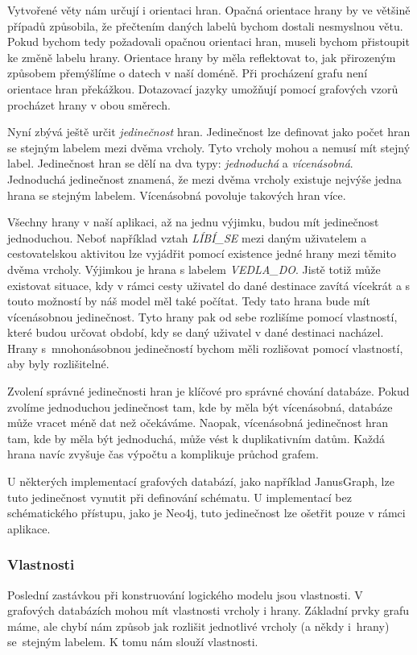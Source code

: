 \documentclass[
  program=infoi,
  biblatex=true,
  figures=true,
  glossaries=false,
  index,
  sourcecodes=true
]{kidiplom}
\begin{document}
Vytvořené věty nám určují i orientaci hran. Opačná orientace hrany by ve většině případů způsobila, že přečtením daných labelů bychom dostali nesmyslnou větu. Pokud bychom tedy požadovali opačnou orientaci hran, museli bychom přistoupit ke změně labelu hrany. Orientace hrany by měla reflektovat to, jak přirozeným způsobem přemýšlíme o datech v naší doméně. Při procházení grafu není orientace hran překážkou. Dotazovací jazyky umožňují pomocí grafových vzorů procházet hrany v obou směrech.

Nyní zbývá ještě určit \textit{jedinečnost} hran. Jedinečnost lze definovat jako počet hran se stejným labelem mezi dvěma vrcholy. Tyto vrcholy mohou a nemusí mít stejný label. Jedinečnost hran se dělí na dva typy: \textit{jednoduchá} a \textit{vícenásobná}. Jednoduchá jedinečnost znamená, že mezi dvěma vrcholy existuje nejvýše jedna hrana se stejným labelem. Vícenásobná povoluje takových hran více.

Všechny hrany v naší aplikaci, až na jednu výjimku, budou mít jedinečnost jednoduchou. Neboť například vztah \textit{LÍBÍ\_SE} mezi daným uživatelem a cestovatelskou aktivitou lze vyjádřit pomocí existence jedné hrany mezi těmito dvěma vrcholy. Výjimkou je hrana s labelem \textit{VEDLA\_DO}. Jistě totiž může existovat situace, kdy v rámci cesty uživatel do dané destinace zavítá vícekrát a s touto možností by náš model měl také počítat. Tedy tato hrana bude mít vícenásobnou jedinečnost. Tyto hrany pak od sebe rozlišíme pomocí vlastností, které budou určovat období, kdy se daný uživatel v dané destinaci nacházel. Hrany s~mnohonásobnou jedinečností bychom měli rozlišovat pomocí vlastností, aby byly rozlišitelné.

Zvolení správné jedinečnosti hran je klíčové pro správné chování databáze. Pokud zvolíme jednoduchou jedinečnost tam, kde by měla být vícenásobná, databáze může vracet méně dat než očekáváme. Naopak, vícenásobná jedinečnost hran tam, kde by měla být jednoduchá, může vést k duplikativním datům. Každá hrana navíc zvyšuje čas výpočtu a komplikuje průchod grafem.

U některých implementací grafových databází, jako například JanusGraph, lze tuto jedinečnost vynutit při definování schématu. U implementací bez schématického přístupu, jako je Neo4j, tuto jedinečnost lze ošetřit pouze v rámci aplikace.

\subsubsection{Vlastnosti}
Poslední zastávkou při konstruování logického modelu jsou vlastnosti. V grafových databázích mohou mít vlastnosti vrcholy i hrany. Základní prvky grafu máme, ale chybí nám způsob jak rozlišit jednotlivé vrcholy (a někdy i~hrany) se~stejným labelem. K tomu nám slouží vlastnosti.
\end{document}
